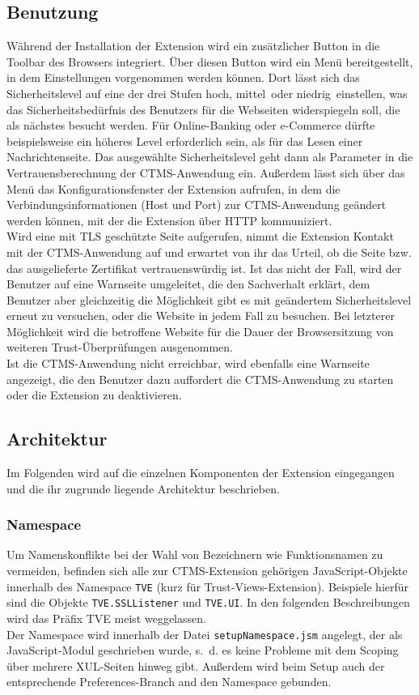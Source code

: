 \documentclass[accentcolor=tud1c,article,colorback,11pt]{tudreport}
\begin{document}
\subsection{Benutzung}
Während der Installation der Extension wird ein zusätzlicher Button in die Toolbar des Browsers integriert. Über diesen Button wird ein Menü bereitgestellt, in dem Einstellungen vorgenommen werden können. Dort lässt sich das Sicherheitslevel auf eine der drei Stufen \glqq hoch\grqq, \glqq mittel\grqq ~oder \glqq niedrig\grqq ~einstellen, was das Sicherheitsbedürfnis des Benutzers für die Webseiten widerspiegeln soll, die als nächstes besucht werden. Für Online-Banking oder e-Commerce dürfte beispielsweise ein höheres Level erforderlich sein, als für das Lesen einer Nachrichtenseite. Das ausgewählte Sicherheitslevel geht dann als Parameter in die Vertrauensberechnung der CTMS-Anwendung ein. Außerdem lässt sich über das Menü das Konfigurationsfenster der Extension aufrufen, in dem die Verbindungsinformationen (Host und Port) zur CTMS-Anwendung geändert werden können, mit der die Extension über HTTP kommuniziert.\\
Wird eine mit TLS geschützte Seite aufgerufen, nimmt die Extension Kontakt mit der CTMS-Anwendung auf und erwartet von ihr das Urteil, ob die Seite bzw. das ausgelieferte Zertifikat vertrauenswürdig ist. Ist das nicht der Fall, wird der Benutzer auf eine Warnseite umgeleitet, die den Sachverhalt erklärt, dem Benutzer aber gleichzeitig die Möglichkeit gibt es mit geändertem Sicherheitslevel erneut zu versuchen, oder die Website in jedem Fall zu besuchen. Bei letzterer Möglichkeit wird die betroffene Website für die Dauer der Browsersitzung von weiteren Trust-Überprüfungen ausgenommen.\\
Ist die CTMS-Anwendung nicht erreichbar, wird ebenfalls eine Warnseite angezeigt, die den Benutzer dazu auffordert die CTMS-Anwendung zu starten oder die Extension zu deaktivieren.

\subsection{Architektur}
Im Folgenden wird auf die einzelnen Komponenten der Extension eingegangen und die ihr zugrunde liegende Architektur beschrieben.

\subsubsection{Namespace}
Um Namenskonflikte bei der Wahl von Bezeichnern wie Funktionsnamen zu vermeiden, befinden sich alle zur CTMS-Extension gehörigen JavaScript-Objekte innerhalb des Namespace \texttt{TVE} (kurz für Trust-Views-Extension). Beispiele hierfür sind die Objekte \texttt{TVE.SSLListener} und \texttt{TVE.UI}. In den folgenden Beschreibungen wird das Präfix TVE meist weggelassen.\\
Der Namespace wird innerhalb der Datei \texttt{setupNamespace.jsm} angelegt, der als JavaScript-Modul \cite{jsm} geschrieben wurde, s.~d. es keine Probleme mit dem Scoping über mehrere XUL-Seiten hinweg gibt. Außerdem wird beim Setup auch der entsprechende Preferences-Branch and den Namespace gebunden.
\end{document}
